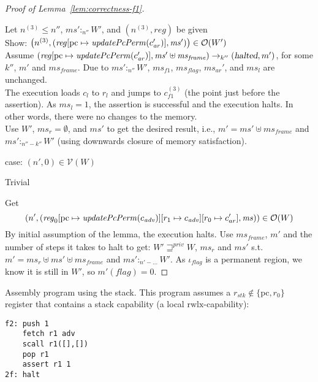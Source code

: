 \documentclass[a4paper]{article}
\newcommand{\update}[2]{[#1 \mapsto #2]}
\newcommand{\var}[1]{\mathit{#1}}
\newcommand{\hs}{\var{ms}}
\newcommand{\ms}{\hs}
\newcommand{\pcreg}{\mathrm{pc}}
\newcommand{\reg}{\var{reg}}
\newcommand{\heap}{\var{mem}}
\newcommand{\stk}{\var{stk}}
\newcommand{\flag}{\var{flag}}
\newcommand{\halted}{\textsl{halted}}
\newcommand{\plainfun}[2]{
  \ifthenelse{\equal{#2}{}}
  {\mathit{#1}}
  {\mathit{#1}(#2)}
}
\newcommand{\updatePcPerm}[1]{\plainfun{updatePcPerm}{#1}}
\newcommand{\futurestr}{\mathbin{\sqsupseteq}^{\var{priv}}}
\newcommand{\heapSat}[3][\heap]{#1 :_{#2} #3}
\newcommand{\asmType}{\plaindom{AsmType}}
\newcommand{\plaindom}[1]{\mathrm{#1}}
\newcommand{\intr}[2]{\mathcal{#1}}
\newcommand{\valueintr}[1]{\intr{V}{#1}}
\newcommand{\stdvr}{\valueintr{\asmType}}
\newcommand{\observations}{\mathcal{O}}
\newcommand{\npair}[2][n]{\left(#1,#2 \right)}
\newcommand{\plainperm}[1]{\mathrm{#1}}
\newcommand{\rwlx}{\plainperm{rwlx}}
\newcommand{\step}[1][]{\rightarrow_{#1}}
\begin{document}
\begin{proof}[Proof of Lemma~\ref{lem:correctness-f1}]
\begin{enumproof}[resume]
\begin{enumproof}
\begin{enumproof}
                      Let $n^{(3)} \leq n''$, $\heapSat[\ms']{n''}{W'}$, and $\npair[n^{(3)}]{\reg}$ be given\\
                      Show: $\npair[n^{(3)}]{(\reg\update{\pcreg}{\updatePcPerm{c_{\var{ar}}'}},\ms')} \in \observations(W')$\\
                      Assume $(\reg\update{\pcreg}{\updatePcPerm{c_{\var{ar}}'}},\ms' \uplus \ms_{\var{frame}}) \step[k''] (\halted, m')$, for some $k''$, $m'$ and $\ms_{\var{frame}}$. Due to $\heapSat[\ms']{n''}{W'}$, $\ms_{f1}$, $\ms_\flag$, $\ms_{\var{ar}}'$, and $\ms_l$ are unchanged. \\
                      The execution loads $c_l$ to $r_l$ and jumps to $c_{f1}^{(3)}$ (the point just before the assertion). As $\ms_l = 1$, the assertion is successful and the execution halts. In other words, there were no changes to the memory.\\
                      Use $W'$, $\ms_r = \emptyset$, and $\ms'$ to get the desired result, i.e., $m' = \ms' \uplus \ms_{\var{frame}}$ and $\heapSat[\ms']{n''-k''}{W'}$ (using downwards closure of memory satisfaction).          
                    \end{enumproof}
                  \item case: $\npair[n']{0} \in \stdvr(W)$
                    \begin{enumproof}
                    \item Trivial
                    \end{enumproof}
                  \end{enumproof}
                \end{enumproof}
                Get
                \[
                  \npair[n']{(\reg_0\update{\pcreg}{\updatePcPerm{c_{\var{adv}}}}\update{r_1}{c_{\var{adv}}}\update{r_0}{c_{ar}'},\ms)} \in \observations(W)
                \]
                By initial assumption of the lemma, the execution halts. Use $\ms_{\var{frame}}$, $m'$ and the number of steps it takes to halt to get:
                $W' \futurestr W$, $\ms_r$ and $\ms'$ s.t. $m' = \ms_r \uplus \ms' \uplus \ms_{\var{frame}}$ and $\heapSat[\ms']{n' - \dots}{W'}$. As $\iota_\flag$ is a permanent region, we know it is still in $W'$, so $m'(\flag) = 0$.
              \end{proof}


              Assembly program using the stack. This program assumes a $r_\stk \not\in \{\pcreg,r_0\}$ register that contains a stack capability (a local $\rwlx$-capability):
\begin{verbatim}
f2: push 1
    fetch r1 adv
    scall r1([],[])
    pop r1
    assert r1 1
2f: halt
\end{verbatim}
              
\end{document}
